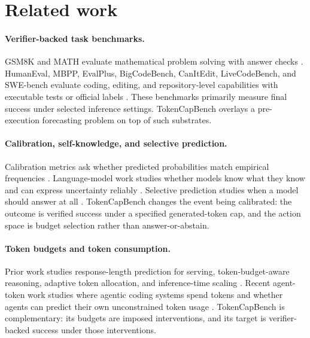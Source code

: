 \documentclass{article}
\newcommand{\bench}{TokenCapBench\xspace}
\begin{document}
\section{Related work}

\paragraph{Verifier-backed task benchmarks.}
GSM8K and MATH evaluate mathematical problem solving with answer checks \citep{cobbe2021training,hendrycks2021math}. HumanEval, MBPP, EvalPlus, BigCodeBench, CanItEdit, LiveCodeBench, and SWE-bench evaluate coding, editing, and repository-level capabilities with executable tests or official labels \citep{chen2021codex,austin2021program,liu2023evalplus,zhuo2024bigcodebench,cassano2023canitedit,jain2025livecodebench,jimenez2024swebench}. These benchmarks primarily measure final success under selected inference settings. \bench overlays a pre-execution forecasting problem on top of such substrates.

\paragraph{Calibration, self-knowledge, and selective prediction.}
Calibration metrics ask whether predicted probabilities match empirical frequencies \citep{brier1950verification,niculescu2005predicting,guo2017calibration}. Language-model work studies whether models know what they know and can express uncertainty reliably \citep{kadavath2022know,lin2022uncertainty}. Selective prediction studies when a model should answer at all \citep{geifman2017selective}. \bench changes the event being calibrated: the outcome is verified success under a specified generated-token cap, and the action space is budget selection rather than answer-or-abstain.

\paragraph{Token budgets and token consumption.}
Prior work studies response-length prediction for serving, token-budget-aware reasoning, adaptive token allocation, and inference-time scaling \citep{zheng2023response,han2025tale,li2025selfbudgeter,brown2024monkeys,snell2024scaling}. Recent agent-token work studies where agentic coding systems spend tokens and whether agents can predict their own unconstrained token usage \citep{bai2026tokenconsumption}. \bench is complementary: its budgets are imposed interventions, and its target is verifier-backed success under those interventions.
\end{document}
